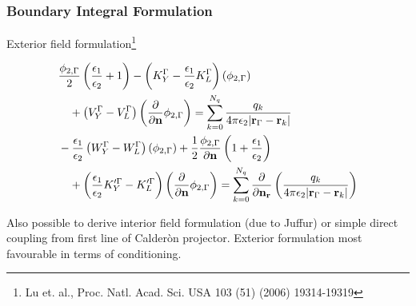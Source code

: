 \documentclass[dvipsnames,10pt]{beamer}
\begin{document}
\begin{frame}
    \frametitle{Boundary Integral Formulation}

    Exterior field formulation\footnote{Lu et. al., Proc. Natl. Acad. Sci. USA 103 (51) (2006) 19314-19319}
    
\begin{align}
    &\begin{multlined}[t][0.48\textwidth] \frac{\phi_{2,\Gamma}}{2}\left(\frac{\epsilon_1}{\epsilon_2}+1\right) - \left(K_Y^\Gamma - \frac{\epsilon_1}{\epsilon_2}K_L^\Gamma\right)(\phi_{2,\Gamma}) \\
    + \left(V_Y^\Gamma - V_L^\Gamma\right)\left( \frac{\partial}{\partial \mathbf{n}} \phi_{2,\Gamma} \right) = \sum_{k=0}^{N_q}  \frac{q_k}{4\pi\epsilon_2|\mathbf{r}_{\Gamma} - \mathbf{r}_k|}
    \end{multlined} \nonumber \\
    &\begin{multlined}[t][0.48\textwidth] -\frac{\epsilon_1}{\epsilon_2}\left(W_Y^\Gamma - W_L^\Gamma\right)(\phi_{2,\Gamma}) +  \frac{1}{2}\frac{\phi_{2,\Gamma}}{\partial\mathbf{n}}\left(1+\frac{\epsilon_1}{\epsilon_2}\right) \\
    + \left(\frac{\epsilon_1}{\epsilon_2}K_Y^{\prime\Gamma} - K_L^{\prime\Gamma}\right)\left( \frac{\partial}{\partial \mathbf{n}} \phi_{2,\Gamma} \right) = \sum_{k=0}^{N_q}  \frac{\partial}{\partial\mathbf{n}_\mathbf{r}}\left(\frac{q_k}{4\pi\epsilon_2|\mathbf{r}_{\Gamma} - \mathbf{r}_k|}\right)\nonumber
    \end{multlined}
\end{align}

Also possible to derive interior field formulation (due to Juffur) or simple 
direct coupling from first line of Calder\`{o}n projector. 
Exterior formulation most favourable in terms of conditioning.

\end{frame}
\end{document}
